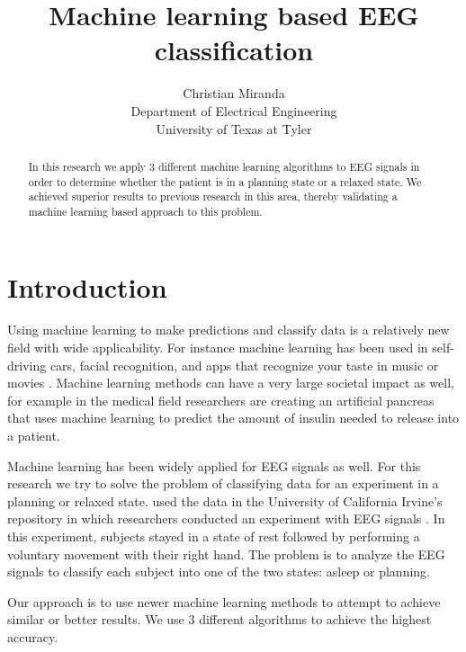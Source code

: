 \documentclass[conference,compsoc]{IEEEtran}
\begin{document}
\author{Christian Miranda\\Department of Electrical Engineering\\University of Texas at Tyler}
\title{Machine learning based EEG classification}
\maketitle

\begin{abstract}
In this research we apply 3 different machine learning algorithms to EEG signals in order to determine whether the patient is in a planning state or a relaxed state.  We achieved superior results to previous research in this area, thereby validating a machine learning based approach to this problem.

\end{abstract}

\section{Introduction}
Using machine learning to make predictions and classify data is a relatively new field with wide applicability.  For instance machine learning has been used in self-driving cars, facial recognition, and apps that recognize your taste in music or movies \cite{machine,cars}.  Machine learning methods can have a very large societal impact as well, for example in the medical field researchers are creating an artificial pancreas that uses machine learning \cite{diabetes} to predict the amount of insulin needed to release into a patient.

Machine learning has been widely applied for EEG signals as well.    For this research we try to solve the problem of classifying data for an experiment in a planning or relaxed state.  used the data in the University of California Irvine's repository in which researchers conducted an experiment with EEG signals \cite{classsvm}.  In this experiment,  subjects stayed in a state of rest followed by performing a voluntary movement with their right hand. The problem is to analyze the EEG signals to classify each subject into one of the two states: asleep or planning. 

Our approach is to use newer machine learning methods to attempt to achieve similar or better results. We use 3 different algorithms to achieve the highest accuracy. %
\end{document}
